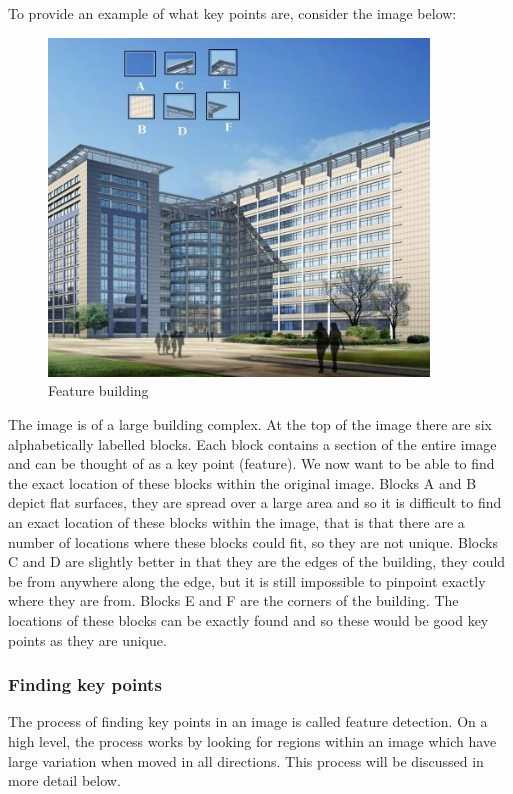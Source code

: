 \documentclass[11pt,a4paper]{report}
\begin{document}
				To provide an example of what key points are, consider the image below:
				
				\begin{figure}[H]
					\centering
					\includegraphics[width=0.9\textwidth]{feature_building}
					\caption{Feature building}
					\label{fig:feature_building}
				\end{figure}
				
				The image is of a large building complex. At the top of the image there are six alphabetically labelled blocks. Each block contains a section of the entire image and can be thought of as a key point (feature). We now want to be able to find the exact location of these blocks within the original image. 
				Blocks A and B depict flat surfaces, they are spread over a large area and so it is difficult to find an exact location of these blocks within the image, that is that there are a number of locations where these blocks could fit, so they are not unique.
				Blocks C and D are slightly better in that they are the edges of the building, they could be from anywhere along the edge, but it is still impossible to pinpoint exactly where they are from.
				Blocks E and F are the corners of the building. The locations of these blocks can be exactly found and so these would be good key points as they are unique.
			
			\subsubsection{Finding key points}
				The process of finding key points in an image is called feature detection. On a high level, the process works by looking for regions within an image which have large variation when moved in all directions. This process will be discussed in more detail below.
				
\end{document}
